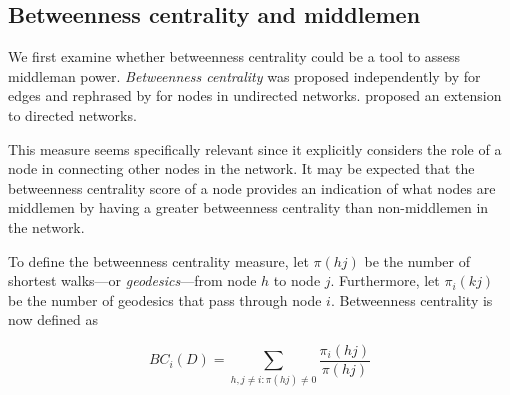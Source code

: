 \subsection{Betweenness centrality and middlemen}

We first examine whether betweenness centrality could be a tool to assess middleman power. \emph{Betweenness centrality} was proposed independently by \citet{Anthonisse1971} for edges and rephrased by \citet{Freeman1977} for nodes in undirected networks. \citet{White1994} proposed an extension to directed networks.

This measure seems specifically relevant since it explicitly considers the role of a node in connecting other nodes in the network. It may be expected that the betweenness centrality score of a node provides an indication of what nodes are middlemen by having a greater betweenness centrality than non-middlemen in the network.

To define the betweenness centrality measure, let $\pi(hj)$ be the number of shortest walks---or \emph{geodesics}---from node $h$ to node $j$. Furthermore, let $\pi_{i}(kj)$ be the number of geodesics that pass through node $i$. Betweenness centrality is now defined as

\begin{equation} \label{betweennesscentrality}
BC_{i}(D) = \sum_{h,j \neq i \colon \pi(hj) \neq 0} \frac{\pi_{i}(hj)}{\pi(hj)}
\end{equation}

